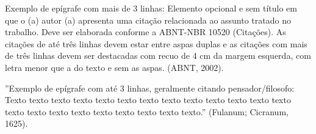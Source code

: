 
\vspace*{10cm}
\begin{citacao}
Exemplo de epígrafe com mais de 3 linhas: Elemento opcional e sem título em que o (a) autor (a) apresenta uma citação relacionada ao assunto tratado no trabalho. Deve ser elaborada conforme a ABNT-NBR 10520 (Citações). As citações de até três linhas devem estar entre aspas duplas e as citações com mais de três linhas devem ser destacadas com recuo de 4 cm da margem esquerda, com letra menor que a do texto e sem as aspas. (ABNT, 2002).
\end{citacao}

    \vspace*{5cm}
	
		''Exemplo de epígrafe com até 3 linhas, geralmente citando pensador/filosofo: Texto texto texto texto texto texto texto texto texto texto texto texto texto texto texto texto texto texto texto texto texto texto.'' (Fulanum; Cicranum, 1625).
	
\newpage
